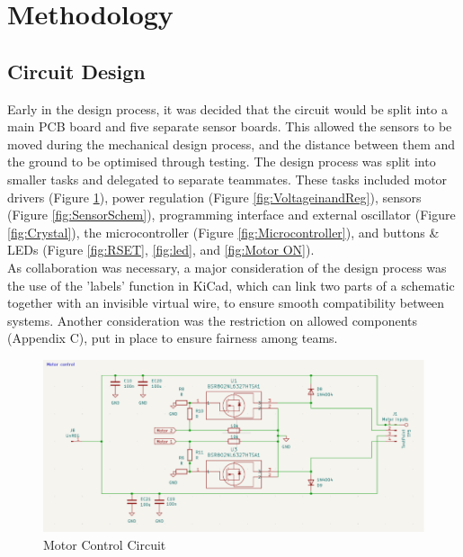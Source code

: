 \documentclass{article}
\begin{document}
\section{Methodology}
\subsection{Circuit Design}
Early in the design process, it was decided that the circuit would be split into a main PCB board and five separate sensor boards. This allowed the sensors to be moved during the mechanical design process, and the distance between them and the ground to be optimised through testing. The design process was split into smaller tasks and delegated to separate teammates. These tasks included motor drivers (Figure \ref{fig:MotorControlCircuit}), power regulation (Figure \ref{fig:VoltageinandReg}), sensors (Figure \ref{fig:SensorSchem}), programming interface and external oscillator (Figure \ref{fig:Crystal}), the microcontroller (Figure \ref{fig:Microcontroller}), and buttons \& LEDs (Figure \ref{fig:RSET}, \ref{fig:led}, and \ref{fig:Motor ON}).
\\

As collaboration was necessary, a major consideration of the design process was the use of the 'labels' function in KiCad, which can link two parts of a schematic together with an invisible virtual wire, to ensure smooth compatibility between systems. Another consideration was the restriction on allowed components (Appendix C), put in place to ensure fairness among teams.


\begin{figure}[H]
    \centering
    \includegraphics[width=0.8\linewidth]{REPORT/MotorControlCircuit.png}
    \caption{Motor Control Circuit}
    \label{fig:MotorControlCircuit}
\end{figure}
\end{document}
